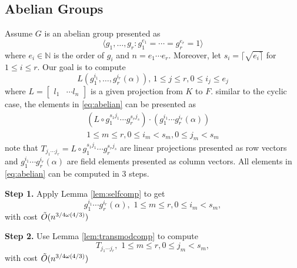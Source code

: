 

\subsection{Abelian Groups}\label{ssec:proj_abelian}

Assume $G$ is an abelian group presented as 
$$ \langle g_1, \ldots , g_r: g_{1}^{e_1} = \cdots = g_{r}^{e_r} = 1 \rangle$$
 where $ e_i \in \mathbb{N}$
is the order of $g_i$ and $n = e_1 \cdots e_r$. Moreover, let $s_i = \lceil	\sqrt{e_i \rceil}$ for $ 1\leq i \leq r$.
 Our goal is to compute 
\begin{equation}\label{eq:abelian}
L (g_1^{i_1},  \ldots, g_r^{i_r}(\alpha)), \, 1 \leq j \leq r, 0 \leq i_j \leq e_j
\end{equation}
 where $L = \begin{bmatrix} l_1 & \cdots l_n \end{bmatrix}$ is a given projection from $K$ to $F$. 
similar to the cyclic case, the elements in \eqref{eq:abelian} can be presented as 
\begin{equation}
\begin{split}
(L \circ g_1^{s_1j_1} \cdots g_r^{s_rj_s})\cdot (g_1^{i_1} \cdots g_r^{i_r}(\alpha))\\ 1\leq m \leq r, 0\leq i_m < s_m, 0 \leq j_m < s_m
\end{split}
\end{equation}
note that $T_{j_1\cdots j_r} = L \circ g_1^{s_1j_1} \cdots g_r^{s_rj_s}$ are linear projections 
presented as row vectors and $g_1^{i_1} \cdots g_r^{i_r}(\alpha)$ are field elements presented as column vectors. All elements in \eqref{eq:abelian} can be computed in 3 steps.

\textbf{Step 1.} Apply Lemma \ref{lem:selfcomp} to get 
$$g_1^{i_1} \cdots g_r^{i_r}(\alpha), \,\, 1\leq m \leq r, 0\leq i_m < s_m,$$
with cost $\tilde{O}(n^{3/4 \omega(4/3)})$

\textbf{Step 2.} Use Lemma \ref{lem:transmodcomp} to compute 
$$T_{j_1\cdots j_r}, \,\, 1\leq m \leq r, 0 \leq j_m < s_m,$$
with cost $\tilde{O}(n^{3/4 \omega(4/3)})$

